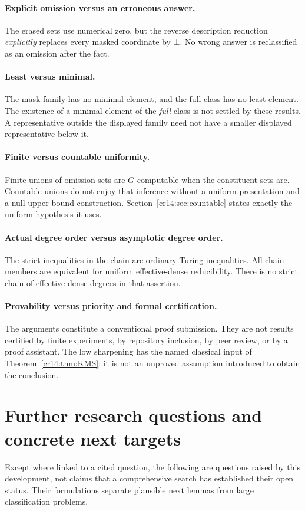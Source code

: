 \documentclass[11pt,a4paper]{article}
\theoremstyle{definition}
\theoremstyle{remark}
\begin{document}
\paragraph{Explicit omission versus an erroneous answer.}
The erased sets use numerical zero, but the reverse description reduction
\emph{explicitly} replaces every masked coordinate by $\bot$. No wrong
answer is reclassified as an omission after the fact.

\paragraph{Least versus minimal.}
The mask family has no minimal element, and the full class has no least
element. The existence of a minimal element of the \emph{full} class is
not settled by these results. A representative outside the displayed
family need not have a smaller displayed representative below it.

\paragraph{Finite versus countable uniformity.}
Finite unions of omission sets are $G$-computable when the constituent
sets are. Countable unions do not enjoy that inference without a uniform
presentation and a null-upper-bound construction. Section~\ref{cr14:sec:countable}
states exactly the uniform hypothesis it uses.

\paragraph{Actual degree order versus asymptotic degree order.}
The strict inequalities in the chain are ordinary Turing inequalities.
All chain members are equivalent for uniform effective-dense reducibility.
There is no strict chain of effective-dense degrees in that assertion.

\paragraph{Provability versus priority and formal certification.}
The arguments constitute a conventional proof submission. They are not
results certified by finite experiments, by repository inclusion, by peer
review, or by a proof assistant. The low sharpening has the named classical
input of Theorem~\ref{cr14:thm:KMS}; it is not an unproved assumption introduced
to obtain the conclusion.

\section{Further research questions and concrete next targets}
\label{cr14:sec:questions}
Except where linked to a cited question, the following are questions raised
by this development, not claims that a comprehensive search has established
their open status. Their formulations separate plausible next lemmas from
large classification problems.
\end{document}
